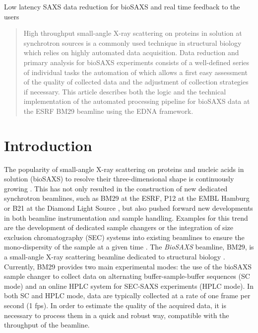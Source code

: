 \documentclass[preprint,pdf]{iucr}              %
\begin{document}

\maketitle                        %

\begin{synopsis}
Low latency SAXS data reduction for bioSAXS and real time feedback to the users
\end{synopsis}

\begin{abstract}
High throughput small-angle X-ray scattering on proteins in solution at
synchrotron sources is a commonly used technique in structural biology which
relies on highly automated data acquisition.
Data reduction and primary analysis for bioSAXS experiments consists of a
well-defined series of individual tasks the automation of which allows a first
easy assessment of the quality of collected data and the adjustment of
collection strategies if necessary. 
This article describes both the logic and the technical implementation of the
automated processing pipeline for bioSAXS data at the ESRF BM29 beamline using
the EDNA framework.
\end{abstract}


\section{Introduction}
The popularity of small-angle X-ray scattering on proteins and nucleic acids in
solution (bioSAXS) to resolve their three-dimensional shape is continuously
growing \cite{Graewert2013,Hura2009,Reyes2014}.
This has not only resulted in the construction of new dedicated
synchrotron beamlines, such as BM29 at the ESRF, P12 at the EMBL Hamburg or B21
at the Diamond Light Source \cite{BM29paper,P12,B21}, but also pushed forward
new developments in both beamline instrumentation and sample handling.
Examples for this trend are the development of dedicated sample changers
\cite{SCpaper} or the integration of size exclusion chromatography (SEC) systems
into existing beamlines to ensure the mono-dispersity of the sample at a given
time \cite{SECPaper2012,SECP12,SECSWING}.
The \textit{BioSAXS} beamline, BM29, is a small-angle
X-ray scattering beamline dedicated to structural biology \cite{BM29paper}.
Currently, BM29 provides two main experimental modes: 
the use of the
bioSAXS sample changer to collect data on alternating buffer-sample-buffer
sequences (SC mode) and an online HPLC system \cite{SECPaper2012} for
SEC-SAXS experiments (HPLC mode).
In both SC and HPLC mode, data are typically collected at a rate of one frame per second
(1 fps).
In order to estimate the quality of the acquired data, it is
necessary to process them in a quick and robust way, compatible with the
throughput of the beamline.
\end{document}
